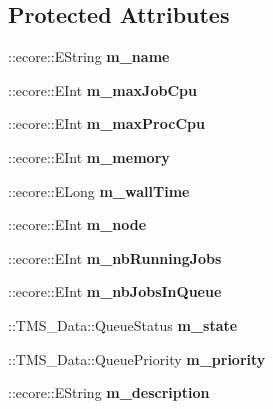 \subsection*{Protected Attributes}
\begin{DoxyCompactItemize}
\item 
\hypertarget{classTMS__Data_1_1Queue_a969200d4c23d48ba33ebb1eeb0e4b49a}{
::ecore::EString {\bfseries m\_\-name}}
\label{classTMS__Data_1_1Queue_a969200d4c23d48ba33ebb1eeb0e4b49a}

\item 
\hypertarget{classTMS__Data_1_1Queue_a5c8981f6cbb6d68cf74f266d6365e80f}{
::ecore::EInt {\bfseries m\_\-maxJobCpu}}
\label{classTMS__Data_1_1Queue_a5c8981f6cbb6d68cf74f266d6365e80f}

\item 
\hypertarget{classTMS__Data_1_1Queue_ab48426c03a074f81468fded9fcecc522}{
::ecore::EInt {\bfseries m\_\-maxProcCpu}}
\label{classTMS__Data_1_1Queue_ab48426c03a074f81468fded9fcecc522}

\item 
\hypertarget{classTMS__Data_1_1Queue_ad115fd2eecbafe454322ae9bc1463a91}{
::ecore::EInt {\bfseries m\_\-memory}}
\label{classTMS__Data_1_1Queue_ad115fd2eecbafe454322ae9bc1463a91}

\item 
\hypertarget{classTMS__Data_1_1Queue_a7a8ab68a002ed2225a22c7b752a4b227}{
::ecore::ELong {\bfseries m\_\-wallTime}}
\label{classTMS__Data_1_1Queue_a7a8ab68a002ed2225a22c7b752a4b227}

\item 
\hypertarget{classTMS__Data_1_1Queue_a0d929724cb9d1b275161764e835a9996}{
::ecore::EInt {\bfseries m\_\-node}}
\label{classTMS__Data_1_1Queue_a0d929724cb9d1b275161764e835a9996}

\item 
\hypertarget{classTMS__Data_1_1Queue_a61b637192c164b47ed21a07e669b702d}{
::ecore::EInt {\bfseries m\_\-nbRunningJobs}}
\label{classTMS__Data_1_1Queue_a61b637192c164b47ed21a07e669b702d}

\item 
\hypertarget{classTMS__Data_1_1Queue_a98ca85741c24c6af67c3de3ee775fc97}{
::ecore::EInt {\bfseries m\_\-nbJobsInQueue}}
\label{classTMS__Data_1_1Queue_a98ca85741c24c6af67c3de3ee775fc97}

\item 
\hypertarget{classTMS__Data_1_1Queue_ab61ae3f8ed0a9b6d6e02ca748772510d}{
::TMS\_\-Data::QueueStatus {\bfseries m\_\-state}}
\label{classTMS__Data_1_1Queue_ab61ae3f8ed0a9b6d6e02ca748772510d}

\item 
\hypertarget{classTMS__Data_1_1Queue_ae5786ad5910ff43a38a28073f26ffc8a}{
::TMS\_\-Data::QueuePriority {\bfseries m\_\-priority}}
\label{classTMS__Data_1_1Queue_ae5786ad5910ff43a38a28073f26ffc8a}

\item 
\hypertarget{classTMS__Data_1_1Queue_ac44b97ea62ac2b10ea429981b0081107}{
::ecore::EString {\bfseries m\_\-description}}
\label{classTMS__Data_1_1Queue_ac44b97ea62ac2b10ea429981b0081107}

\end{DoxyCompactItemize}


